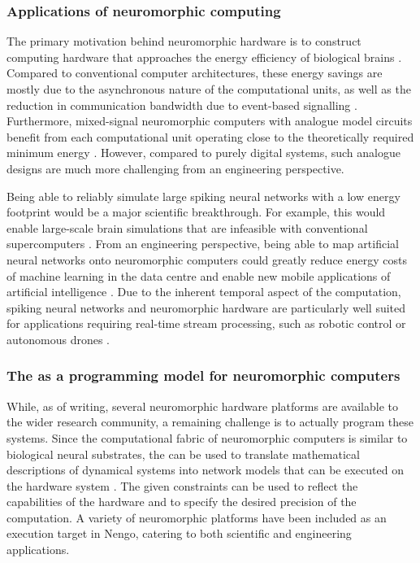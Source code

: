 \subsubsection{Applications of neuromorphic computing}
The primary motivation behind neuromorphic hardware is to construct computing hardware that approaches the energy efficiency of biological brains \citep{boahen2017neuromorph}.
Compared to conventional computer architectures, these energy savings are mostly due to the asynchronous nature of the computational units, as well as the reduction in communication bandwidth due to event-based signalling \citep{painkras2013spinnaker}.
Furthermore, mixed-signal neuromorphic computers with analogue model circuits benefit from each computational unit operating close to the theoretically required minimum energy \citep{boahen2017neuromorph}.
However, compared to purely digital systems, such analogue designs are much more challenging from an engineering perspective.

Being able to reliably simulate large spiking neural networks with a low energy footprint would be a major scientific breakthrough.
For example, this would enable large-scale brain simulations that are infeasible with conventional supercomputers \citep{calimera2013human}.
From an engineering perspective, being able to map artificial neural networks onto neuromorphic computers could greatly reduce energy costs of machine learning in the data centre and enable new mobile applications of artificial intelligence \citep{hunsberger2016training,blouw2018benchmarking,goltz2020fast,blouw2020eventdriven}.
Due to the inherent temporal aspect of the computation, spiking neural networks and neuromorphic hardware are particularly well suited for applications requiring real-time stream processing, such as robotic control or autonomous drones \citep{komer2015biologically,yan2021comparing}.

\subsubsection{The \NEF as a programming model for neuromorphic computers}
While, as of writing, several neuromorphic hardware platforms are available to the wider research community, a remaining challenge is to actually program these systems.
Since the computational fabric of neuromorphic computers is similar to biological neural substrates, the \NEF can be used to translate mathematical descriptions of dynamical systems into network models that can be executed on the hardware system \citep{boahen2017neuromorph}.
The given constraints can be used to reflect the capabilities of the hardware and to specify the desired precision of the computation.
A variety of neuromorphic platforms have been included as an execution target in Nengo, catering to both scientific and engineering applications.

